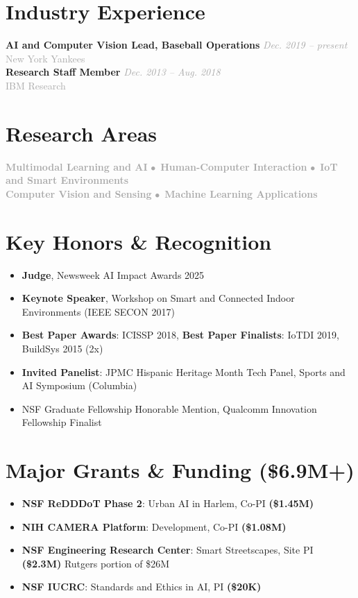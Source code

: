 \documentclass[11pt]{article}
\newcommand{\bulletpoint}{\textcolor{mBlue}{$\bullet$}}
\newcommand{\positionentry}[4]{
  \textbf{#1} \hfill \textcolor{darkGray}{\textit{#2}}\\
  \textcolor{darkGray}{#3} \hfill #4
}
\begin{document}
\section{Industry Experience}
\positionentry{AI and Computer Vision Lead, Baseball Operations}{Dec. 2019 -- present}{New York Yankees}{}\\[1mm]
\positionentry{Research Staff Member}{Dec. 2013 -- Aug. 2018}{IBM Research}{}

\section{Research Areas}
\begin{center}
\textcolor{darkGray}{
\textbf{Multimodal Learning and AI} \bulletpoint\ \textbf{Human-Computer Interaction} \bulletpoint\ \textbf{IoT and Smart Environments}\\[1mm]
\textbf{Computer Vision and Sensing} \bulletpoint\ \textbf{Machine Learning Applications}
}
\end{center}

\section{Key Honors \& Recognition}
\begin{itemize}
\item \textbf{\textcolor{mBlue}{Judge}}, Newsweek AI Impact Awards 2025
\item \textbf{\textcolor{mBlue}{Keynote Speaker}}, Workshop on Smart and Connected Indoor Environments (IEEE SECON 2017)
\item \textbf{\textcolor{mBlue}{Best Paper Awards}}: ICISSP 2018, \textbf{Best Paper Finalists}: IoTDI 2019, BuildSys 2015 (2x)
\item \textbf{\textcolor{mBlue}{Invited Panelist}}: JPMC Hispanic Heritage Month Tech Panel, Sports and AI Symposium (Columbia)
\item NSF Graduate Fellowship Honorable Mention, Qualcomm Innovation Fellowship Finalist
\end{itemize}

\section{Major Grants \& Funding (\$6.9M+)}
\begin{itemize}
\item \textbf{\textcolor{mBlue}{NSF ReDDDoT Phase 2}}: Urban AI in Harlem, Co-PI \textbf{(\$1.45M)}
\item \textbf{\textcolor{mBlue}{NIH CAMERA Platform}}: Development, Co-PI \textbf{(\$1.08M)}
\item \textbf{\textcolor{mBlue}{NSF Engineering Research Center}}: Smart Streetscapes, Site PI \textbf{(\$2.3M)} Rutgers portion of \$26M
\item \textbf{\textcolor{mBlue}{NSF IUCRC}}: Standards and Ethics in AI, PI \textbf{(\$20K)}
\end{itemize}
\end{document}
